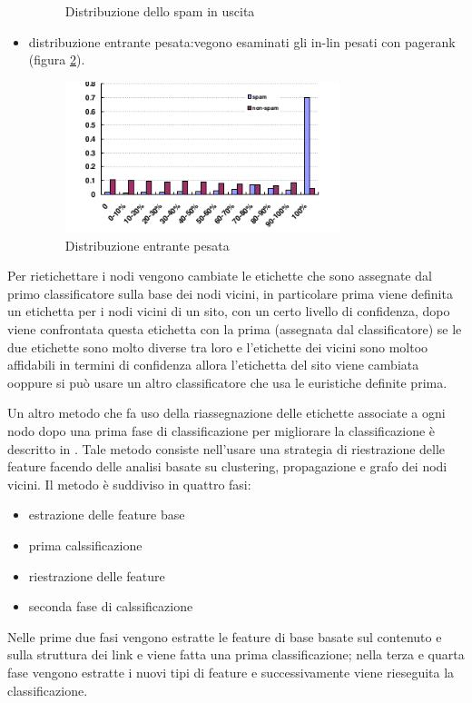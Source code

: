 \begin{itemize}
\begin{figure}
\caption{Distribuzione dello spam in uscita}
\label{img:gan2}
\end{figure}
\item distribuzione entrante pesata:vegono esaminati gli in-lin  pesati con pagerank (figura \ref{img:gan3}).
 \begin{figure}
 \centering
\includegraphics[width=8cm]{immagini/gan/immagine3.png}
\caption{Distribuzione entrante pesata}
\label{img:gan3}
\end{figure}
\end{itemize}
Per rietichettare i nodi vengono cambiate le etichette che sono assegnate dal primo classificatore  sulla base dei nodi vicini, in particolare
prima viene definita un etichetta per i nodi vicini di un sito, con un certo livello di confidenza, dopo viene confrontata questa etichetta con la prima (assegnata dal classificatore) se le due etichette sono molto diverse tra loro e l'etichette dei vicini sono moltoo affidabili in termini di confidenza 
allora l’etichetta del sito viene cambiata ooppure si può usare un altro classificatore che usa le euristiche definite prima.

Un altro metodo che fa uso della riassegnazione delle etichette associate a ogni nodo dopo una prima fase di classificazione per migliorare la classificazione è descritto in \cite{Geng:2008:IWS:1367497.1367685}. Tale metodo consiste nell'usare una strategia di riestrazione delle feature facendo delle analisi basate su clustering, propagazione e grafo dei nodi vicini. Il metodo è suddiviso in quattro fasi:
\begin{itemize}
 \item estrazione delle feature base
 \item prima calssificazione
 \item riestrazione delle feature
 \item seconda fase di calssificazione
\end{itemize}
Nelle prime due fasi vengono estratte le feature di base basate sul contenuto e sulla struttura dei link e viene fatta una prima classificazione; nella terza e quarta fase vengono estratte i nuovi tipi di feature e successivamente viene rieseguita la classificazione.


